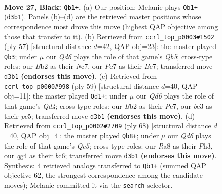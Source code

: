 \documentclass[11pt]{article}
\begin{document}
\clearpage

\begin{figure}[p]\centering
\begin{subfigure}{0.46\textwidth}\centering
\resizebox{\linewidth}{!}{%
\newchessgame
\chessboard[
  setfen={r7/2p2kpp/3p4/8/pP4Q1/3qB1P1/Pb3P1P/6K1 b - - 0 27},
  showmover=false,
  pgfstyle=straightmove, color=movearrow, markmove={d3-b1}
]}
\caption{}
\end{subfigure}\hfill
\begin{subfigure}{0.46\textwidth}\centering
\resizebox{\linewidth}{!}{%
\newchessgame
\chessboard[
  setfen={6k1/2n1bppp/3p4/4p3/1q6/2NQPBP1/5P1P/6K1 b - - 8 29},
  showmover=false,
  pgfstyle=straightmove, color=movearrow, markmove={b4-b3}
]}
\caption{}
\end{subfigure}
\\[4pt]
\begin{subfigure}{0.46\textwidth}\centering
\resizebox{\linewidth}{!}{%
\newchessgame
\chessboard[
  setfen={6k1/2p2p2/2p3p1/2Pq3p/Q7/P5P1/2P2P1P/6K1 b - - 0 30},
  showmover=false,
  pgfstyle=straightmove, color=movearrow, markmove={d5-d1}
]}
\caption{}
\end{subfigure}\hfill
\begin{subfigure}{0.46\textwidth}\centering
\resizebox{\linewidth}{!}{%
\newchessgame
\chessboard[
  setfen={6k1/1p3q1p/2b3pB/2P1Q3/p7/P6P/1P4P1/6K1 w - - 2 35},
  showmover=false,
  pgfstyle=straightmove, color=movearrow, markmove={e5-b8}
]}
\caption{}
\end{subfigure}
\caption{\textbf{Move 27, Black: \texttt{Qb1+}.} (a) Our position; Melanie plays \texttt{Qb1+} (\texttt{d3b1}). Panels (b)--(d) are the retrieved master positions whose correspondence most drove this move (highest QAP objective among those that transfer to it). (b) Retrieved from \texttt{ccrl\_top\_p0003\#1502} (ply 57) [structural distance $d$=42, QAP obj=23]: the master played \texttt{Qb3}; under $\mu$ our \emph{Qd6} plays the role of that game's \emph{Qb5}; cross-type roles: our \emph{B}b2 as their \emph{N}c7, our \emph{P}c7 as their \emph{B}e7; transferred move \texttt{d3b1} \textbf{(endorses this move)}. (c) Retrieved from \texttt{ccrl\_top\_p0000\#998} (ply 59) [structural distance $d$=40, QAP obj=11]: the master played \texttt{Qd1+}; under $\mu$ our \emph{Qd6} plays the role of that game's \emph{Qd4}; cross-type roles: our \emph{B}b2 as their \emph{P}c7, our \emph{b}e3 as their \emph{p}c5; transferred move \texttt{d3b1} \textbf{(endorses this move)}. (d) Retrieved from \texttt{ccrl\_top\_p0002\#2709} (ply 68) [structural distance $d$=40, QAP obj=4]: the master played \texttt{Qb8+}; under $\mu$ our \emph{Qd6} plays the role of that game's \emph{Qe5}; cross-type roles: our \emph{R}a8 as their \emph{P}h3, our \emph{q}g4 as their \emph{b}c6; transferred move \texttt{d3b1} \textbf{(endorses this move)}. Synthesis: 4 retrieved analogs transferred to \texttt{Qb1+} (summed QAP objective 62, the strongest correspondence among the candidate moves); Melanie committed it via the \texttt{search} selector.}
\label{fig:thought-m53}
\end{figure}
\end{document}
